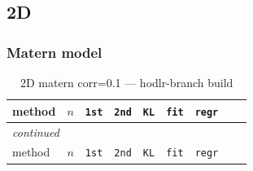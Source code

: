 \documentclass[11pt,a4paper]{article}
\begin{document}
\subsection{2D}
\subsubsection*{Matern model}
\begin{center}
\begin{longtable}{llrcccccc}
\caption{2D matern corr=0.1 --- hodlr-branch build}
\\\toprule
method & $n$ & \texttt{1st} & \texttt{2nd} & \texttt{KL} & \texttt{fit} & \texttt{regr}\\
\midrule
\endfirsthead
\multicolumn{8}{l}{\small\emph{continued}}\\
\toprule
method & $n$ & \texttt{1st} & \texttt{2nd} & \texttt{KL} & \texttt{fit} & \texttt{regr}\\
\midrule
\endhead


\end{longtable}
\end{center}
\end{document}

